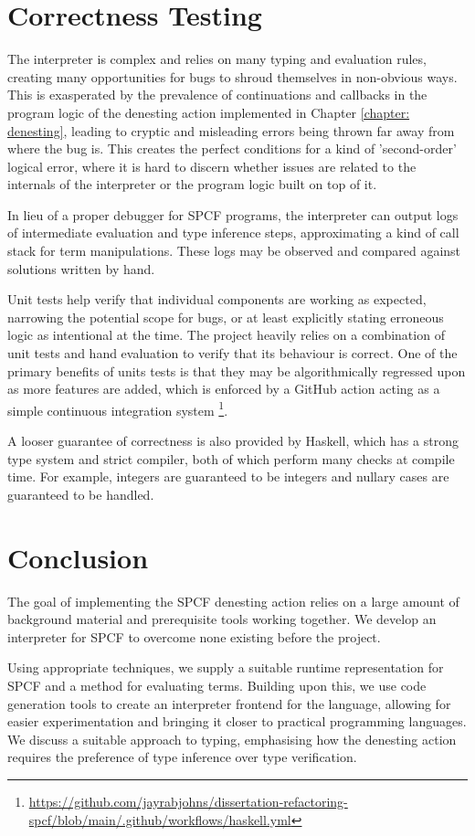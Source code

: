 \documentclass[12pt,a4paper]{report}
\theoremstyle{definition}
\theoremstyle{definition}
\theoremstyle{remark}
\begin{document}
\section{Correctness Testing}
The interpreter is complex and relies on many typing and evaluation rules, creating many opportunities for bugs to shroud themselves in non-obvious ways. This is exasperated by the prevalence of continuations and callbacks in the program logic of the denesting action implemented in Chapter \ref{chapter: denesting}, leading to cryptic and misleading errors being thrown far away from where the bug is. This creates the perfect conditions for a kind of 'second-order' logical error, where it is hard to discern whether issues are related to the internals of the interpreter or the program logic built on top of it.

In lieu of a proper debugger for SPCF programs, the interpreter can output logs of intermediate evaluation and type inference steps, approximating a kind of call stack for term manipulations. These logs may be observed and compared against solutions written by hand.

Unit tests help verify that individual components are working as expected, narrowing the potential scope for bugs, or at least explicitly stating erroneous logic as intentional at the time. The project heavily relies on a combination of unit tests and hand evaluation to verify that its behaviour is correct. One of the primary benefits of units tests is that they may be algorithmically regressed upon as more features are added, which is enforced by a GitHub action acting as a simple continuous integration system \footnote{\url{https://github.com/jayrabjohns/dissertation-refactoring-spcf/blob/main/.github/workflows/haskell.yml}}.

A looser guarantee of correctness is also provided by Haskell, which has a strong type system and strict compiler, both of which perform many checks at compile time. For example, integers are guaranteed to be integers and nullary cases are guaranteed to be handled. 

\section{Conclusion}
The goal of implementing the SPCF denesting action relies on a large amount of background material and prerequisite tools working together. We develop an interpreter for SPCF to overcome none existing before the project.

Using appropriate techniques, we supply a suitable runtime representation for SPCF and a method for evaluating terms. Building upon this, we use code generation tools to create an interpreter frontend for the language, allowing for easier experimentation and bringing it closer to practical programming languages. We discuss a suitable approach to typing, emphasising how the denesting action requires the preference of type inference over type verification. 
\end{document}

